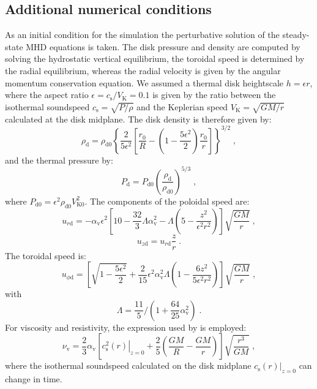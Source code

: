 \documentclass{aa}
\begin{document}
\begin{appendix}

\section{Additional numerical conditions}
\label{AddNumCond}

As an initial condition for the simulation the perturbative solution of the steady-state MHD equations is taken.  The disk pressure and density are computed by
solving the hydrostatic vertical equilibrium, the toroidal speed is determined by the radial equilibrium, whereas the radial velocity is given by the angular momentum conservation equation.  We
assumed a thermal disk heightscale $h = \epsilon r$, where the aspect ratio $\epsilon = c_\mathrm{s}/V_\mathrm{K} = 0.1$ is given by the ratio between the isothermal soundspeed $c_\mathrm{s} = \sqrt{P/\rho}$ and the Keplerian
speed $V_\mathrm{K} = \sqrt{GM/r}$ calculated at the disk midplane.  The disk density is therefore given by:
\begin{equation}
\rho_\mathrm{d} = \rho_\mathrm{d0} \left\{\frac{2}{5\epsilon^2}\left[\frac{r_0}{R}-\left(1-\frac{5\epsilon^2}{2}\right)\frac{r_0}{r}\right]\right\}^{3/2} \; ,
\end{equation}
and the thermal pressure by:
\begin{equation}
P_\mathrm{d} = P_\mathrm{d0} \left( \frac{\rho_\mathrm{d}}{\rho_\mathrm{d0}} \right)^{5/3} \; ,
\end{equation}
where $P_\mathrm{d0} = \epsilon^2 \rho_\mathrm{d0} V^2_\mathrm{K0}$.  The components of the poloidal speed are:
\begin{equation}
u_{r\mathrm{d}} = -\alpha_\mathrm{v}\epsilon^2\left[10-\frac{32}{3}\Lambda\alpha_\mathrm{v}^2-\Lambda\left(5 -\frac{z^2}{\epsilon^2r^2}\right)\right] \sqrt{\frac{GM}{r}} \; ,
\end{equation}
\begin{equation}
u_{z\mathrm{d}} = u_{r\mathrm{d}} \frac{z}{r} \; .
\end{equation}
The toroidal speed is:
\begin{equation}
u_{\phi\mathrm{d}} = \left[ \sqrt{1-\frac{5\epsilon^2}{2}}+\frac{2}{15}\epsilon^2\alpha^2_\mathrm{v}\Lambda\left(1-\frac{6z^2}{5\epsilon^2r^2} \right) \right] \sqrt{\frac{GM}{r}} \; ,
\end{equation}
with
\[
\Lambda = \frac{11}{5} \big/ \left( 1+\frac{64}{25}\alpha_\mathrm{v}^2\right) \; .
\]
For viscosity and resistivity, the expression used by \citet{2009A&A...508.1117Z} is employed:
\begin{equation}
\nu_\mathrm{v} = \frac{2}{3}\alpha_\mathrm{v} \left[ \left. c^2_\mathrm{s}\left(r\right) \right|_{z=0}+\frac{2}{5}\left( \frac{GM}{R}-\frac{GM}{r}\right)\right]\sqrt{\frac{r^3}{GM}} \; ,
\end{equation}
where the isothermal soundspeed calculated on the disk midplane $\left. c_\mathrm{s}\left(r\right) \right|_{z=0}$ can change in time.


\end{appendix}
\end{document}

